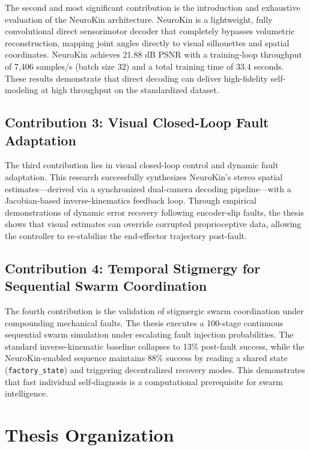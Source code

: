 \documentclass[12pt,a4paper,oneside]{report}
\begin{document}
The second and most significant contribution is the introduction and exhaustive evaluation of the NeuroKin architecture. NeuroKin is a lightweight, fully convolutional direct sensorimotor decoder that completely bypasses volumetric reconstruction, mapping joint angles directly to visual silhouettes and spatial coordinates. NeuroKin achieves 21.88 dB PSNR with a training-loop throughput of 7,406 samples/s (batch size 32) and a total training time of 33.4 seconds. These results demonstrate that direct decoding can deliver high-fidelity self-modeling at high throughput on the standardized dataset.

\subsection{Contribution 3: Visual Closed-Loop Fault Adaptation}
\label{subsec:contrib_closed_loop}

The third contribution lies in visual closed-loop control and dynamic fault adaptation. This research successfully synthesizes NeuroKin's stereo spatial estimates—derived via a synchronized dual-camera decoding pipeline—with a Jacobian-based inverse-kinematics feedback loop. Through empirical demonstrations of dynamic error recovery following encoder-slip faults, the thesis shows that visual estimates can override corrupted proprioceptive data, allowing the controller to re-stabilize the end-effector trajectory post-fault.

\subsection{Contribution 4: Temporal Stigmergy for Sequential Swarm Coordination}
\label{subsec:contrib_stigmergy}

The fourth contribution is the validation of stigmergic swarm coordination under compounding mechanical faults. The thesis executes a 100-stage continuous sequential swarm simulation under escalating fault injection probabilities. The standard inverse-kinematic baseline collapses to 13\% post-fault success, while the NeuroKin-enabled sequence maintains 88\% success by reading a shared state (\texttt{factory\_state}) and triggering decentralized recovery modes. This demonstrates that fast individual self-diagnosis is a computational prerequisite for swarm intelligence.

\section{Thesis Organization}
\label{sec:thesis_organization}
\end{document}
